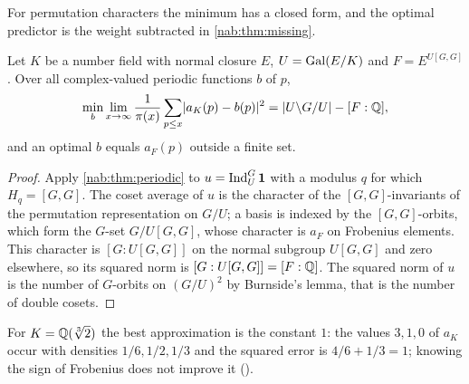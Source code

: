 For permutation characters the minimum has a closed form, and the optimal predictor is
the weight subtracted in \cref{nab:thm:missing}.

\begin{corollary}\label{nab:cor:doublecoset}
Let $K$ be a number field with normal closure $E$, $U=\operatorname{Gal}(E/K)$ and $F=E^{U[G,G]}$. Over
all complex-valued periodic functions $b$ of $p$,
\[
 \min_b\lim_{x\to\infty}\frac1{\pi(x)}\sum_{p\le x}\lvert a_K(p)-b(p)\rvert^2
 =\lvert U\backslash G/U\rvert-[F:\mathbb{Q}],
\]
and an optimal $b$ equals $a_F(p)$ outside a finite set.
\end{corollary}
\begin{proof}
Apply \cref{nab:thm:periodic} to $u=\operatorname{Ind}_U^G\mathbf{1}$ with a modulus $q$ for which
$H_q=[G,G]$. The coset average of $u$ is the character of the $[G,G]$-invariants of the
permutation representation on $G/U$; a basis is indexed by the $[G,G]$-orbits, which form
the $G$-set $G/U[G,G]$, whose character is $a_F$ on Frobenius elements. This character is
$[G:U[G,G]]$ on the normal subgroup $U[G,G]$ and zero elsewhere, so its squared norm is
$[G:U[G,G]]=[F:\mathbb{Q}]$. The squared norm of $u$ is the number of $G$-orbits on $(G/U)^2$ by
Burnside's lemma, that is the number of double cosets.
\end{proof}

For $K=\mathbb{Q}(\sqrt[3]2)$ the best approximation is the constant $1$: the values $3,1,0$ of
$a_K$ occur with densities $1/6,1/2,1/3$ and the squared error is $4/6+1/3=1$; knowing
the sign of Frobenius does not improve it
().

